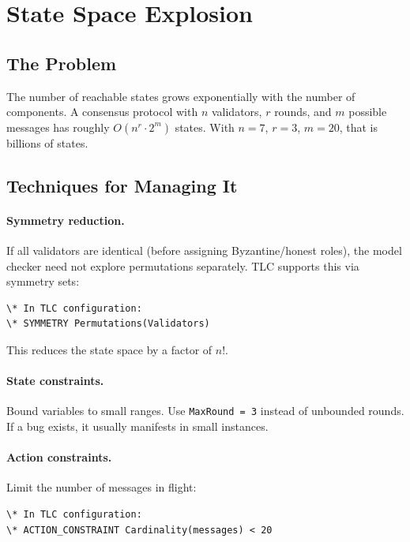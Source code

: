 \section{State Space Explosion}


\subsection{The Problem}

The number of reachable states grows exponentially with the number of components.
A consensus protocol with $n$ validators, $r$ rounds, and $m$ possible messages has
roughly $O(n^r \cdot 2^m)$ states. With $n = 7$, $r = 3$, $m = 20$, that is billions
of states.

\subsection{Techniques for Managing It}

\paragraph{Symmetry reduction.}
If all validators are identical (before assigning Byzantine/honest roles), the model
checker need not explore permutations separately. TLC supports this via symmetry sets:

\begin{lstlisting}[language=TLA,caption={Symmetry reduction}]
\* In TLC configuration:
\* SYMMETRY Permutations(Validators)
\end{lstlisting}

This reduces the state space by a factor of $n!$.

\paragraph{State constraints.}
Bound variables to small ranges. Use \texttt{MaxRound = 3} instead of unbounded rounds.
If a bug exists, it usually manifests in small instances.

\paragraph{Action constraints.}
Limit the number of messages in flight:

\begin{lstlisting}[language=TLA,caption={Action constraint to limit state space}]
\* In TLC configuration:
\* ACTION_CONSTRAINT Cardinality(messages) < 20
\end{lstlisting}

